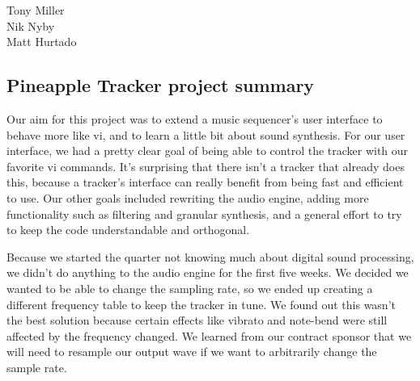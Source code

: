 \documentclass[12pt,letterpaper]{article}
\begin{document}
\begin{flushright}
Tony Miller\\
Nik Nyby\\
Matt Hurtado
\end{flushright}

\begin{center}
\section*{Pineapple Tracker project summary}
\end{center}


\doublespacing
\par
Our aim for this project was to extend a music sequencer's user interface to behave more like vi, and to learn a little bit about sound synthesis. For our user interface, we had a pretty clear goal of being able to control the tracker with our favorite vi commands. It's surprising that there isn't a tracker that already does this, because a tracker's interface can really benefit from being fast and efficient to use. Our other goals included rewriting the audio engine, adding more functionality such as filtering and granular synthesis, and a general effort to try to keep the code understandable and orthogonal.

\par
Because we started the quarter not knowing much about digital sound processing, we didn't do anything to the audio engine for the first five weeks. We decided we wanted to be able to change the sampling rate, so we ended up creating a different frequency table to keep the tracker in tune. We found out this wasn't the best solution because certain effects like vibrato and note-bend were still affected by the frequency changed. We learned from our contract sponsor that we will need to resample our output wave if we want to arbitrarily change the sample rate.

\par
\end{document}
